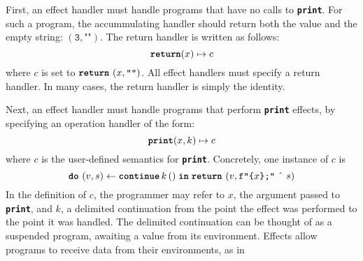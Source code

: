 First, an effect handler must handle programs that have no calls to \textbf{\texttt{print}}. For such a program, the accummulating handler should return both the value and the empty string: $(\texttt{3}, \texttt{""})$. The return handler is written as follows:
\[\textbf{\texttt{return}}(x) \mapsto {c}\]
where $c$ is set to $\texttt{\textbf{return}} \,\, {(x, \texttt{""})}$. All effect handlers must specify a return handler. In many cases, the return handler is simply the identity. 

Next, an effect handler must handle programs that perform \textbf{\texttt{print}} effects, by specifying an operation handler of the form:
\[\textbf{\texttt{print}}(x, k) \mapsto {c}\]
where $c$ is the user-defined semantics for \textbf{\texttt{print}}.
Concretely, one instance of $c$ is 
\[{\texttt{\textbf{do}} \,\, {(v, s)} \leftarrow {\textbf{\texttt{continue}} \, {k} \, {()}} \; \textbf{\texttt{in}} \; {\texttt{\textbf{return}} \,\, {(v, \texttt{f"\{$x$\};"} \text{ \^\ } s)}}}\]
In the definition of $c$, the programmer may refer to $x$, the argument passed to \textbf{\texttt{print}}, and $k$, a delimited continuation from the point the effect was performed to the point it was handled. The delimited continuation can be thought of as a suspended program, awaiting a value from its environment. Effects allow programs to receive data from their environments, as in
\begin{center}
\end{center}
